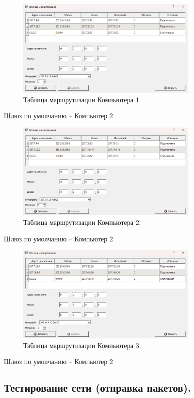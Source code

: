 \documentclass[12pt,onecolumn]{article}
\begin{document}
\begin{figure}[H]
  \centering
  \includegraphics[width=0.8\textwidth]{image/part3/routing-table-1.png}
  \caption{Таблица маршрутизации Компьютера 1.}
\end{figure}
Шлюз по умолчанию -- Компьютер 2
\begin{figure}[H]
  \centering
  \includegraphics[width=0.8\textwidth]{image/part3/routing-table-2.png}
  \caption{Таблица маршрутизации Компьютера 2.}
\end{figure}
Шлюз по умолчанию -- Компьютер 2
\begin{figure}[H]
  \centering
  \includegraphics[width=0.8\textwidth]{image/part3/routing-table-3.png}
  \caption{Таблица маршрутизации Компьютера 3.}
\end{figure}
Шлюз по умолчанию -- Компьютер 2
\subsection{Тестирование сети (отправка пакетов).}
\end{document}
